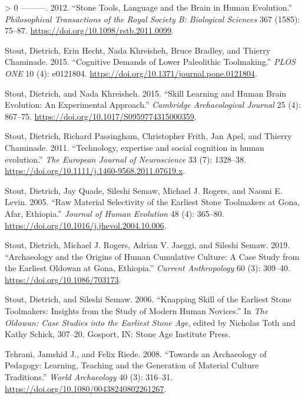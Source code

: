 \documentclass[smallextended]{svjour3}       %
\newlength{\cslhangindent}
\newenvironment{CSLReferences}[3] %
 {%
  \setlength{\parindent}{0pt}
  \ifodd #1 \everypar{\setlength{\hangindent}{\cslhangindent}}\ignorespaces\fi
  \ifnum #2 > 0
  \setlength{\parskip}{#3\baselineskip}
  \fi
 }%
 {}
\begin{document}
\begin{CSLReferences}{1}{0}
\leavevmode\hypertarget{ref-stout2012}{}%
---------. 2012. {``Stone Tools, Language and the Brain in Human
Evolution.''} \emph{Philosophical Transactions of the Royal Society B:
Biological Sciences} 367 (1585): 75--87.
\url{https://doi.org/10.1098/rstb.2011.0099}.

\leavevmode\hypertarget{ref-stoutCognitiveDemandsLower2015}{}%
Stout, Dietrich, Erin Hecht, Nada Khreisheh, Bruce Bradley, and Thierry
Chaminade. 2015. {``Cognitive {Demands} of {Lower} {Paleolithic}
{Toolmaking}.''} \emph{PLOS ONE} 10 (4): e0121804.
\url{https://doi.org/10.1371/journal.pone.0121804}.

\leavevmode\hypertarget{ref-stout2015}{}%
Stout, Dietrich, and Nada Khreisheh. 2015. {``Skill Learning and Human
Brain Evolution: An Experimental Approach.''} \emph{Cambridge
Archaeological Journal} 25 (4): 867--75.
\url{https://doi.org/10.1017/S0959774315000359}.

\leavevmode\hypertarget{ref-stout2011}{}%
Stout, Dietrich, Richard Passingham, Christopher Frith, Jan Apel, and
Thierry Chaminade. 2011. {``Technology, expertise and social cognition
in human evolution.''} \emph{The European Journal of Neuroscience} 33
(7): 1328--38. \url{https://doi.org/10.1111/j.1460-9568.2011.07619.x}.

\leavevmode\hypertarget{ref-stout2005}{}%
Stout, Dietrich, Jay Quade, Sileshi Semaw, Michael J. Rogers, and Naomi
E. Levin. 2005. {``Raw Material Selectivity of the Earliest Stone
Toolmakers at Gona, Afar, Ethiopia.''} \emph{Journal of Human Evolution}
48 (4): 365--80. \url{https://doi.org/10.1016/j.jhevol.2004.10.006}.

\leavevmode\hypertarget{ref-stout2019}{}%
Stout, Dietrich, Michael J. Rogers, Adrian V. Jaeggi, and Sileshi Semaw.
2019. {``Archaeology and the Origins of Human Cumulative Culture: A Case
Study from the Earliest Oldowan at Gona, Ethiopia.''} \emph{Current
Anthropology} 60 (3): 309--40. \url{https://doi.org/10.1086/703173}.

\leavevmode\hypertarget{ref-stoutKnappingSkillEarliest2006}{}%
Stout, Dietrich, and Sileshi Semaw. 2006. {``Knapping Skill of the
Earliest Stone Toolmakers: Insights from the Study of Modern Human
Novices.''} In \emph{The {Oldowan}: {Case} Studies into the Earliest
{Stone} {Age}}, edited by Nicholas Toth and Kathy Schick, 307--20.
Gosport, IN: Stone Age Institute Press.

\leavevmode\hypertarget{ref-tehrani2008}{}%
Tehrani, Jamshid J., and Felix Riede. 2008. {``Towards an Archaeology of
Pedagogy: Learning, Teaching and the Generation of Material Culture
Traditions.''} \emph{World Archaeology} 40 (3): 316--31.
\url{https://doi.org/10.1080/00438240802261267}.


\end{CSLReferences}
\end{document}
